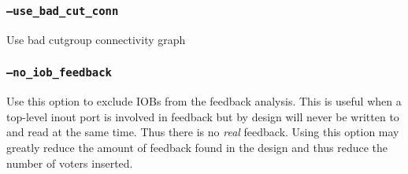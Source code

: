 \subsubsection{\texttt{--use\_bad\_cut\_conn}}
Use bad cutgroup connectivity graph

\subsubsection{\texttt{--no\_iob\_feedback}}
Use this option to exclude IOBs from the feedback analysis. This is useful when
a top-level inout port is involved in feedback but by design will never be 
written to and read at the same time. Thus there is no \emph{real} feedback.
Using this option may greatly reduce the amount of feedback found in the design
and thus reduce the number of voters inserted.






 
